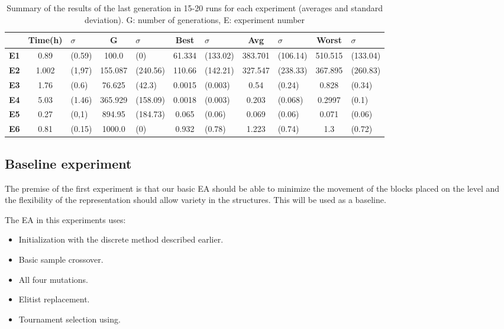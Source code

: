 \documentclass[runningheads,a4paper]{llncs}
\newcommand{\myfloatalign}{\centering} %
\begin{document}
\begin{table}[H]
	\myfloatalign
	\begin{tabular}{cclclclclcl}
		& \textbf{Time(h)} &$\sigma$ & \textbf{G}& $\sigma$&\textbf{Best}& $\sigma$  &\textbf{Avg}&$\sigma$  & \textbf{Worst}&$\sigma$ \\ \hline
		\textbf{E1}&0.89&(0.59)&100.0&(0)&61.334&(133.02)&383.701&(106.14)&510.515&(133.04)\\  \hline
		\textbf{E2}&1.002&(1,97)&155.087&(240.56)&110.66&(142.21)&327.547&(238.33)&367.895&(260.83)  \\  \hline
		\textbf{E3}&1.76&(0.6)&76.625&(42.3)&0.0015&(0.003)&0.54&(0.24)&0.828&(0.34)   \\  \hline
		\textbf{E4}&5.03&(1.46)&365.929&(158.09)&0.0018&(0.003)&0.203&(0.068)&0.2997&(0.1)  \\  \hline
		\textbf{E5}&0.27&(0,1)&894.95&(184.73)& 0.065&(0.06)&0.069&(0.06)&0.071&(0.06)     \\  \hline 
		\textbf{E6}&0.81&(0.15)&1000.0&(0)& 0.932&(0.78)&1.223&(0.74)&1.3&(0.72) \\  \hline
		\hline
	\end{tabular}
	\caption{Summary of the results of the last generation in 15-20 runs for each
		experiment (averages and standard deviation).
		G: number of generations, E: experiment 
		number} %
	\label{t:resOver}
\end{table}
\subsection{Baseline experiment}\label{E1}

The premise of the first experiment is that our basic EA should be able to 
minimize the movement of the blocks placed on the level and the flexibility of 
the representation should allow variety in the structures. This will
be used as a baseline.

The EA in this experiments uses:
\begin{itemize}
	\item  Initialization with the discrete method described earlier.
	\item  Basic sample crossover.
	\item  All four mutations.
	\item  Elitist replacement.
	\item  Tournament selection using.
\end{itemize}
\end{document}
